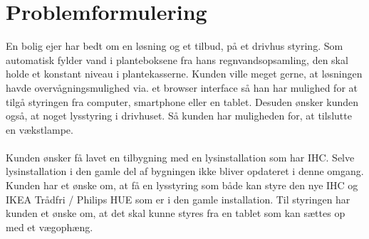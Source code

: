 \section{Problemformulering}

En bolig ejer har bedt om en løsning og et tilbud, på et drivhus styring. 
Som automatisk fylder vand i planteboksene fra hans regnvandsopsamling, den skal holde et konstant niveau i plantekasserne. 
Kunden ville meget gerne, at løsningen havde overvågningsmulighed via. et browser interface så han har mulighed for at tilgå styringen fra 
computer, smartphone eller en tablet.
Desuden ønsker kunden også, at noget lysstyring i drivhuset. Så kunden har muligheden for, at tilslutte en vækstlampe.
\\
\\
Kunden ønsker få lavet en tilbygning med en lysinstallation som har IHC. Selve lysinstallation i den gamle del af bygningen ikke bliver opdateret i denne omgang. 
Kunden har et ønske om, at få en lysstyring som både kan styre den nye IHC og IKEA Trådfri / Philips HUE som er i den gamle installation.
Til styringen har kunden et ønske om, at det skal kunne styres fra en tablet som kan sættes op med et vægophæng.